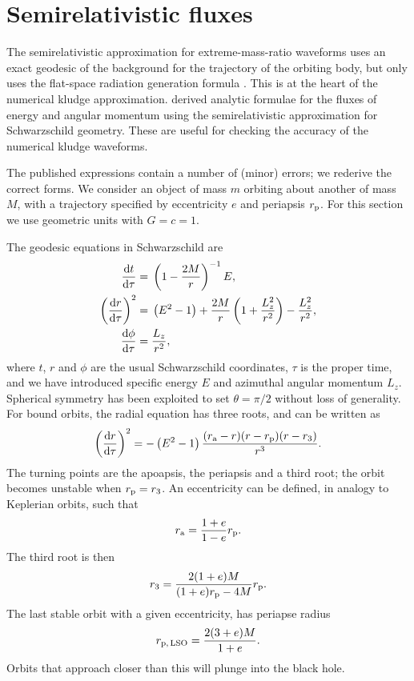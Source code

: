 \chapter{Semirelativistic fluxes}\label{ap:energy}

The semirelativistic approximation for extreme-mass-ratio waveforms uses an exact geodesic of the background for the trajectory of the orbiting body, but only uses the flat-space radiation generation formula \citep{Ruffini1981}. This is at the heart of the numerical kludge approximation. \citet*{Gair2005} derived analytic formulae for the fluxes of energy and angular momentum using the semirelativistic approximation for Schwarzschild geometry. These are useful for checking the accuracy of the numerical kludge waveforms.

The published expressions contain a number of (minor) errors; we rederive the correct forms. We consider an object of mass $m$ orbiting about another of mass $M$, with a trajectory specified by eccentricity $e$ and periapsis $r_\mathrm{p}$. For this section we use geometric units with $G = c = 1$.

The geodesic equations in Schwarzschild are
\begin{subequations}
\begin{align}
\frac{\mathrm{d} {t}}{\mathrm{d} {\tau}} = {} & \left(1-\frac{2M}{r}\right)^{-1}E, \\
\left(\frac{\mathrm{d} {r}}{\mathrm{d} {\tau}}\right)^2 = {} & \left(E^2 - 1\right) + \frac{2M}{r}\left(1 + \frac{L_z^2}{r^2}\right) - \frac{L_z^2}{r^2}, \\
\frac{\mathrm{d} {\phi}}{\mathrm{d} {\tau}} = {} & \frac{L_z}{r^2},
\end{align}
\end{subequations}
where $t$, $r$ and $\phi$ are the usual Schwarzschild coordinates, $\tau$ is the proper time, and we have introduced specific energy $E$ and azimuthal angular momentum $L_z$. Spherical symmetry has been exploited to set $\theta = \pi/2$ without loss of generality. For bound orbits, the radial equation has three roots, and can be written as
\begin{equation}
\left(\frac{\mathrm{d} {r}}{\mathrm{d} {\tau}}\right)^2 = -\left(E^2 - 1\right)\frac{(r_\mathrm{a} - r)(r - r_\mathrm{p})(r - r_3)}{r^3}.
\end{equation}
The turning points are the apoapsis, the periapsis and a third root; the orbit becomes unstable when $r_\mathrm{p} = r_3$. An eccentricity can be defined, in analogy to Keplerian orbits, such that
\begin{equation}
r_\mathrm{a} = \frac{1 + e}{1 - e}r_\mathrm{p}.
\end{equation}
The third root is then
\begin{equation}
r_3 = \frac{2(1 + e)M}{(1+e)r_\mathrm{p} - 4M}r_\mathrm{p}.
\end{equation}
The last stable orbit with a given eccentricity, has periapse radius
\begin{equation}
r_\mathrm{p,\,LSO} = \frac{2(3 + e)M}{1+e}.
\end{equation}
Orbits that approach closer than this will plunge into the black hole.

